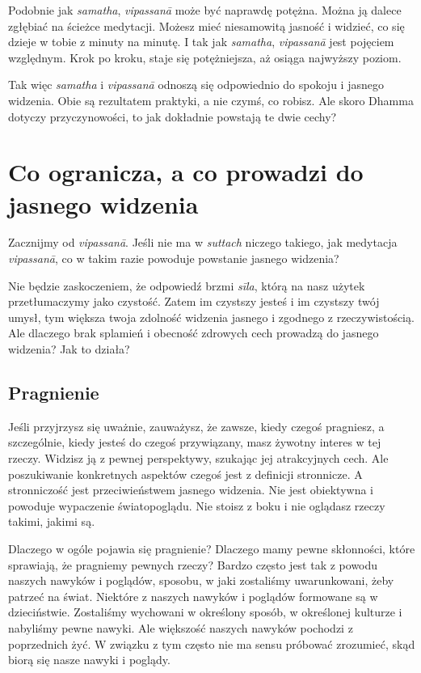\documentclass[12pt,openany]{book}
\begin{document}
Podobnie jak \textit{samatha}, \textit{vipassanā} może być naprawdę potężna. Można ją dalece zgłębiać na ścieżce medytacji. Możesz mieć niesamowitą jasność i widzieć, co się dzieje w tobie z minuty na minutę. I tak jak  \textit{samatha}, \textit{vipassanā} jest pojęciem względnym. Krok po kroku, staje się potężniejsza, aż osiąga najwyższy poziom.

Tak więc \textit{samatha} i \textit{vipassanā} odnoszą się odpowiednio do spokoju i jasnego widzenia. Obie są rezultatem praktyki, a nie czymś, co robisz. Ale skoro Dhamma dotyczy przyczynowości, to jak dokładnie powstają te dwie cechy?

\chapter*{Co ogranicza, a co prowadzi do jasnego widzenia}

Zacznijmy od \textit{vipassanā}. Jeśli nie ma w \textit{suttach} niczego takiego, jak medytacja \textit{vipassanā}, co w takim razie powoduje powstanie jasnego widzenia?

Nie będzie zaskoczeniem, że odpowiedź brzmi \textit{sīla}, którą na nasz użytek przetłumaczymy jako czystość. Zatem im czystszy jesteś i im czystszy twój umysł, tym większa twoja zdolność widzenia jasnego i zgodnego z rzeczywistością. Ale dlaczego brak splamień i obecność zdrowych cech prowadzą do jasnego widzenia? Jak to działa?

\section*{Pragnienie}

Jeśli przyjrzysz się uważnie, zauważysz, że zawsze, kiedy czegoś pragniesz, a szczególnie, kiedy jesteś do czegoś przywiązany, \linebreak masz żywotny interes w tej rzeczy. Widzisz ją z pewnej perspektywy, szukając jej atrakcyjnych cech. Ale poszukiwanie konkretnych aspektów czegoś jest z definicji stronnicze. A stronniczość jest przeciwieństwem jasnego widzenia. Nie jest obiektywna i powoduje wypaczenie światopoglądu. Nie stoisz z boku i nie oglądasz rzeczy takimi, jakimi są.

Dlaczego w ogóle pojawia się pragnienie? Dlaczego mamy \linebreak pewne skłonności, które sprawiają, że pragniemy pewnych rzeczy? Bardzo często jest tak z powodu naszych nawyków i poglądów, sposobu, w jaki zostaliśmy uwarunkowani, żeby patrzeć na świat. Niektóre z naszych nawyków i poglądów formowane są w dzieciństwie. Zostaliśmy wychowani w określony sposób, w określonej kulturze i nabyliśmy pewne nawyki. Ale większość naszych nawyków pochodzi z poprzednich żyć. W związku z tym często nie ma sensu próbować zrozumieć, skąd biorą się nasze nawyki i poglądy.
\end{document}
